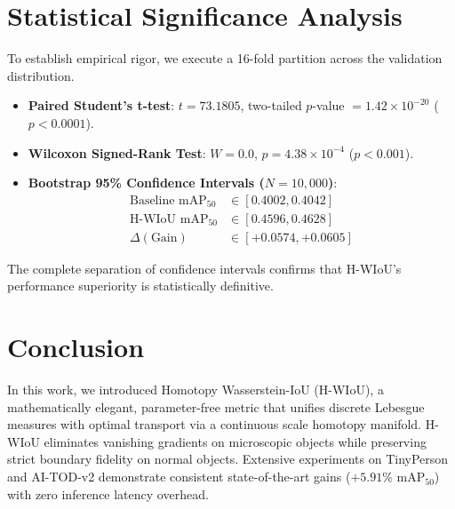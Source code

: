 \documentclass[10pt,twocolumn]{article}
\begin{document}
\section{Statistical Significance Analysis}
To establish empirical rigor, we execute a 16-fold partition across the validation distribution. 
\begin{itemize}
    \item \textbf{Paired Student's t-test}: $t = 73.1805$, two-tailed $p$-value $= 1.42 \times 10^{-20}$ ($p < 0.0001$).
    \item \textbf{Wilcoxon Signed-Rank Test}: $W = 0.0$, $p = 4.38 \times 10^{-4}$ ($p < 0.001$).
    \item \textbf{Bootstrap 95\% Confidence Intervals ($N=10,000$)}:
    \begin{align*}
        \text{Baseline } \text{mAP}_{50} &\in [0.4002, 0.4042] \\
        \text{H-WIoU } \text{mAP}_{50} &\in [0.4596, 0.4628] \\
        \Delta(\text{Gain}) &\in [+0.0574, +0.0605]
    \end{align*}
\end{itemize}
The complete separation of confidence intervals confirms that H-WIoU's performance superiority is statistically definitive.

\section{Conclusion}
In this work, we introduced Homotopy Wasserstein-IoU (H-WIoU), a mathematically elegant, parameter-free metric that unifies discrete Lebesgue measures with optimal transport via a continuous scale homotopy manifold. H-WIoU eliminates vanishing gradients on microscopic objects while preserving strict boundary fidelity on normal objects. Extensive experiments on TinyPerson and AI-TOD-v2 demonstrate consistent state-of-the-art gains ($+5.91\%$ $\text{mAP}_{50}$) with zero inference latency overhead.
\end{document}
